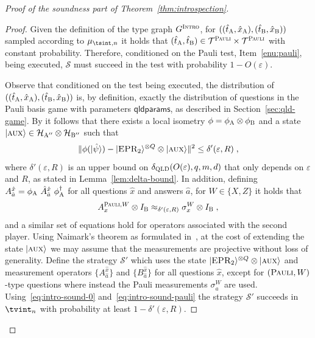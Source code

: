 \documentclass[11pt]{article}
\theoremstyle{definition}
\newcommand{\ket}[1]{|#1\rangle}
\newcommand{\Id}{\ensuremath{I}}
\newcommand{\mH}{\ensuremath{\mathcal{H}}}
\newcommand{\eps}{\varepsilon}
\newcommand{\strategy}{\mathscr{S}}
\newcommand{\type}{\mathcal{T}}
\newcommand{\gamestyle}[1]{\ensuremath{\textsc{#1}}\xspace}
\newcommand{\qld}{\gamestyle{QLD}}
\newcommand{\pauli}{\gamestyle{Pauli}}
\newcommand{\intro}{\gamestyle{Intro}}
\newcommand{\labelstyle}[1]{\ensuremath{\textsc{#1}}\xspace}
\newcommand{\EPR}{\labelstyle{EPR}}
\newcommand{\aux}{\labelstyle{aux}}
\newcommand{\alice}{\labelstyle{A}}
\newcommand{\bob}{\labelstyle{B}}
\newcommand{\typestyle}[1]{\ensuremath{\textsc{#1}}\xspace}
\newcommand{\Pauli}{\typestyle{Pauli}}
\newcommand{\qldparams}{\mathsf{qldparams}}
\begin{document}
\begin{proof}[Proof of the soundness part of Theorem~\ref{thm:introspection}]
  \begin{proof}
    Given the definition of the type graph $G^\intro$, for
    $((\hat{t}_\alice,\hat{x}_\alice),(\hat{t}_\bob,\hat{x}_\bob))$ sampled
    according to $\mu_{\tsint,n}$ it holds that
    $(\hat{t}_\alice,\hat{t}_\bob) \in \type^\pauli \times \type^\pauli$ with
    constant probability.
    Therefore, conditioned on the Pauli test, Item~\ref{enu:pauli}, being
    executed, $\strategy$ must succeed in the test with probability $1-O(\eps)$.

    Observe that conditioned on the test being executed, the distribution of
    $((\hat{t}_\alice,\hat{x}_\alice),(\hat{t}_\bob,\hat{x}_\bob))$ is, by
    definition, exactly the distribution of questions in the Pauli basis game
    with parameters $\qldparams$, as described in Section~\ref{sec:qld-game}.
    By  it follows that there exists a local isometry
    $\phi = \phi_\alice \otimes \phi_\bob$ and a state $\ket{\aux}\in
    \mH_{\alice''}\otimes \mH_{\bob''}$ such that
    \begin{equation}\label{eq:intro-sound-0}
      \Vert \phi (\ket{\hat{\psi}}) - \ket{\EPR_2}^{\otimes Q} \otimes
      \ket{\aux} \Vert^2 \leq \delta'(\eps,R)\;,
    \end{equation}
    where $\delta'(\eps,R)$ is an upper bound on $\delta_\qld(O(\eps),q,m,d)$
    that only depends on $\eps$ and $R$, as stated in
    Lemma~\ref{lem:delta-bound}.
    In addition, defining $A^{\hat{x}}_{\hat{a}} = \phi_\alice~
    \hat{A}^{\hat{x}}_{\hat{a}}~\phi_\alice^\dagger$ for all questions $\hat{x}$ and answers
    $\hat{a}$, for $W \in \{X, Z\}$ it holds that
    \begin{equation}
      \label{eq:intro-sound-pauli}
      A^{\Pauli,W}_x \otimes \Id_\bob \approx_{\delta'(\eps,R)}
      \sigma^W_x \otimes \Id_\bob\;,
    \end{equation}
    and a similar set of equations hold for operators associated with the second
    player.
    Using Naimark's theorem as formulated in~\cite[Theorem 5.1]{ML20}, at the
    cost of extending the state $\ket{\aux}$ we may assume that the measurements
    are projective without loss of generality.
    Define the strategy $\strategy'$ which uses the state $\ket{\EPR_2}^{\otimes
      Q} \otimes \ket{\aux}$ and measurement operators $\{ A^{\hat{x}}_{\hat{a}}
    \}$ and $\{ B^{\hat{x}}_{\hat{a}} \}$ for all questions $\hat{x}$, except
    for $(\Pauli,W)$-type questions where instead the Pauli measurements
    $\sigma^W_{\hat{a}}$ are used.
    Using~\eqref{eq:intro-sound-0} and~\eqref{eq:intro-sound-pauli} the strategy
    $\strategy'$ succeeds in $\tvint_n$ with probability at least
    $1-\delta'(\eps,R)$.
	

\end{proof}
\end{proof}
\end{document}
